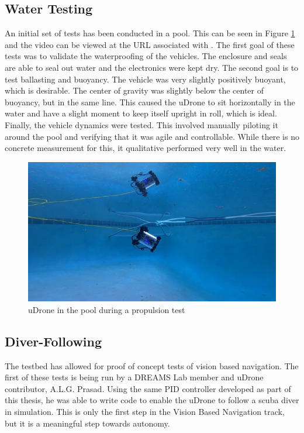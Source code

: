 \subsection{Water Testing}
An initial set of tests has been conducted in a pool. This can be seen in Figure \ref{pool-test} and the video can be viewed at the URL associated with \cite{jd-pool}. The first goal of these tests was to validate the waterproofing of the vehicles. The enclosure and seals are able to seal out water and the electronics were kept dry. The second goal is to test ballasting and buoyancy. The vehicle was very slightly positively buoyant, which is desirable. The center of gravity was slightly below the center of buoyancy, but in the same line. This caused the uDrone to sit horizontally in the water and have a slight moment to keep itself upright in roll, which is ideal. Finally, the vehicle dynamics were tested. This involved manually piloting it around the pool and verifying that it was agile and controllable. While there is no concrete measurement for this, it qualitative performed very well in the water.

\begin{figure}[ht]
    \centering
    \includegraphics[width=\maxwidth{\textwidth}]{img/pool-test.jpeg}
    \caption{uDrone in the pool during a propulsion test}
    \label{pool-test}
\end{figure}

\subsection{Diver-Following}

The testbed has allowed for proof of concept tests of vision based navigation. The first of these tests is being run by a DREAMS Lab member and uDrone contributor, A.L.G. Prasad. Using the same PID controller developed as part of this thesis, he was able to write code to enable the uDrone to follow a scuba diver in simulation. This is only the first step in the Vision Based Navigation track, but it is a meaningful step towards autonomy. 

